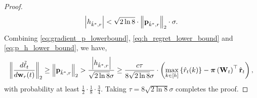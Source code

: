 \begin{proof}
\begin{equation}
\label{eq:p_h_lower_bound}
\begin{split}
	\left| h_{\hat{k}^*,r} \right| < \sqrt{2 \ln{8}} \cdot \left\| {\mathbf{p}}_{\hat{k}^*, r} \right\|_2 \cdot \sigma.
\end{split}
\end{equation}
Combining \cref{eq:gradient_p_lowerbound}, \cref{eq:h_regret_lower_bound} and \cref{eq:p_h_lower_bound}, we have,
\begin{equation*}
\begin{split}
	\left\| \frac{d\tilde{\ell}_t}{d {\mathbf{w}}_r(t)} \right\|_2 \ge \left\| {\mathbf{p}}_{\hat{k}^*, r}\right\|_2 > \frac{\left| h_{\hat{k}^*,r} \right|}{\sqrt{2 \ln{8}} \sigma} \ge \frac{c\tau}{8 \sqrt{2 \ln{8}} \sigma} \cdot \left( \max\limits_{k \in \left[h\right]}\left\{ \hat{r}_t(k) \right\} - {\boldsymbol{\pi}}\left( {\mathbf{W}}_t \right)^\top \hat{{\mathbf{r}}}_t  \right),
\end{split}
\end{equation*}
with probability at least $\frac{1}{2}  \cdot \frac{1}{8} \cdot \frac{3}{4} $. Taking $\tau = 8 \sqrt{2 \ln{8}} \sigma$ completes the proof.
\end{proof}

